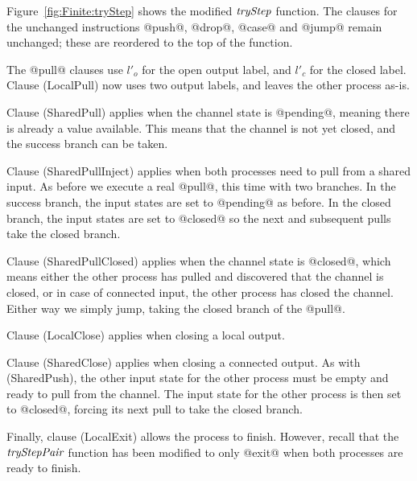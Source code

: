 Figure~\ref{fig:Finite:tryStep} shows the modified $\textit{tryStep}$ function.
The clauses for the unchanged instructions @push@, @drop@, @case@ and @jump@ remain unchanged; these are reordered to the top of the function.

The @pull@ clauses use $l'_o$ for the open output label, and $l'_c$ for the closed label.
Clause (LocalPull) now uses two output labels, and leaves the other process as-is.

Clause (SharedPull) applies when the channel state is @pending@, meaning there is already a value available. This means that the channel is not yet closed, and the success branch can be taken.

Clause (SharedPullInject) applies when both processes need to pull from a shared input. As before we execute a real @pull@, this time with two branches. In the success branch, the input states are set to @pending@ as before. In the closed branch, the input states are set to @closed@ so the next and subsequent pulls take the closed branch.

Clause (SharedPullClosed) applies when the channel state is @closed@, which means either the other process has pulled and discovered that the channel is closed, or in case of connected input, the other process has closed the channel. Either way we simply jump, taking the closed branch of the @pull@.

Clause (LocalClose) applies when closing a local output.

Clause (SharedClose) applies when closing a connected output. As with (SharedPush), the other input state for the other process must be empty and ready to pull from the channel. The input state for the other process is then set to @closed@, forcing its next pull to take the closed branch.

Finally, clause (LocalExit) allows the process to finish. However, recall that the $\textit{tryStepPair}$ function has been modified to only @exit@ when both processes are ready to finish.

